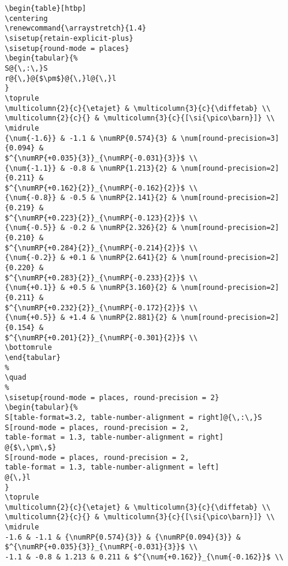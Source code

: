 \documentclass[UKenglish,texlive=2016]{\ATLASLATEXPATH atlasdoc}
\begin{document}
\begin{verbatim}
\begin{table}[htbp]
\centering
\renewcommand{\arraystretch}{1.4}
\sisetup{retain-explicit-plus}
\sisetup{round-mode = places}
\begin{tabular}{%
S@{\,:\,}S
r@{\,}@{$\pm$}@{\,}l@{\,}l
}
\toprule
\multicolumn{2}{c}{\etajet} & \multicolumn{3}{c}{\diffetab} \\
\multicolumn{2}{c}{} & \multicolumn{3}{c}{[\si{\pico\barn}]} \\
\midrule
{\num{-1.6}} & -1.1 & \numRP{0.574}{3} & \num[round-precision=3]{0.094} & 
$^{\numRP{+0.035}{3}}_{\numRP{-0.031}{3}}$ \\
{\num{-1.1}} & -0.8 & \numRP{1.213}{2} & \num[round-precision=2]{0.211} & 
$^{\numRP{+0.162}{2}}_{\numRP{-0.162}{2}}$ \\
{\num{-0.8}} & -0.5 & \numRP{2.141}{2} & \num[round-precision=2]{0.219} & 
$^{\numRP{+0.223}{2}}_{\numRP{-0.123}{2}}$ \\
{\num{-0.5}} & -0.2 & \numRP{2.326}{2} & \num[round-precision=2]{0.210} & 
$^{\numRP{+0.284}{2}}_{\numRP{-0.214}{2}}$ \\
{\num{-0.2}} & +0.1 & \numRP{2.641}{2} & \num[round-precision=2]{0.220} & 
$^{\numRP{+0.283}{2}}_{\numRP{-0.233}{2}}$ \\
{\num{+0.1}} & +0.5 & \numRP{3.160}{2} & \num[round-precision=2]{0.211} & 
$^{\numRP{+0.232}{2}}_{\numRP{-0.172}{2}}$ \\
{\num{+0.5}} & +1.4 & \numRP{2.881}{2} & \num[round-precision=2]{0.154} & 
$^{\numRP{+0.201}{2}}_{\numRP{-0.301}{2}}$ \\
\bottomrule
\end{tabular}
%
\quad
%
\sisetup{round-mode = places, round-precision = 2}
\begin{tabular}{%
S[table-format=3.2, table-number-alignment = right]@{\,:\,}S
S[round-mode = places, round-precision = 2,
table-format = 1.3, table-number-alignment = right]
@{$\,\pm\,$}
S[round-mode = places, round-precision = 2,
table-format = 1.3, table-number-alignment = left]
@{\,}l
}
\toprule
\multicolumn{2}{c}{\etajet} & \multicolumn{3}{c}{\diffetab} \\
\multicolumn{2}{c}{} & \multicolumn{3}{c}{[\si{\pico\barn}]} \\
\midrule
-1.6 & -1.1 & {\numRP{0.574}{3}} & {\numRP{0.094}{3}} & 
$^{\numRP{+0.035}{3}}_{\numRP{-0.031}{3}}$ \\
-1.1 & -0.8 & 1.213 & 0.211 & $^{\num{+0.162}}_{\num{-0.162}}$ \\

\end{verbatim}
\end{document}
